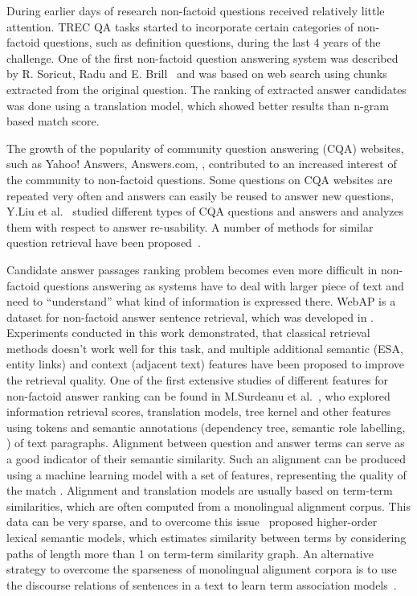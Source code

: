During earlier days of research non-factoid questions received relatively little attention.
TREC QA tasks started to incorporate certain categories of non-factoid questions, such as definition questions, during the last 4 years of the challenge.
One of the first non-factoid question answering system was described by R. Soricut, Radu and E. Brill~\cite{soricut2006automatic} and was based on web search using chunks extracted from the original question.
The ranking of extracted answer candidates was done using a translation model, which showed better results than n-gram based match score.

The growth of the popularity of community question answering (CQA) websites, such as Yahoo! Answers, Answers.com, \etc, contributed to an increased interest of the community to non-factoid questions.
Some questions on CQA websites are repeated very often and answers can easily be reused to answer new questions, Y.Liu et al.~\cite{Liu:2008:USA:1599081.1599144} studied different types of CQA questions and answers and analyzes them with respect to answer re-usability.
A number of methods for similar question retrieval have been proposed~\cite{bernhard2009combining,Shtok:2012:LPA:2187836.2187939,duan2008searching,Jeon:2005:FSQ:1099554.1099572}.

Candidate answer passages ranking problem becomes even more difficult in non-factoid questions answering as systems have to deal with larger piece of text and need to ``understand'' what kind of information is expressed there.
WebAP is a dataset for non-factoid answer sentence retrieval, which was developed in \cite{yang2016beyond}.
Experiments conducted in this work demonstrated, that classical retrieval methods doesn't work well for this task, and multiple additional semantic (ESA, entity links) and context (adjacent text) features have been proposed to improve the retrieval quality.
One of the first extensive studies of different features for non-factoid answer ranking can be found in M.Surdeanu et al.~\cite{surdeanu2011learning}, who explored information retrieval scores, translation models, tree kernel and other features using tokens and semantic annotations (dependency tree, semantic role labelling, \etc) of text paragraphs.
Alignment between question and answer terms can serve as a good indicator of their semantic similarity.
Such an alignment can be produced using a machine learning model with a set of features, representing the quality of the match \cite{wang2015faq}.
Alignment and translation models are usually based on term-term similarities, which are often computed from a monolingual alignment corpus.
This data can be very sparse, and to overcome this issue~\cite{fried2015higher} proposed higher-order lexical semantic models, which estimates similarity between terms by considering paths of length more than 1 on term-term similarity graph.
An alternative strategy to overcome the sparseness of monolingual alignment corpora is to use the discourse relations of sentences in a text to learn term association models~\cite{sharp2015spinning}.

